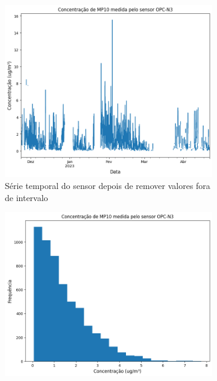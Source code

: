 \begin{figure}[h]
    \centering
    \caption{Série temporal das leituras do sensor OPC-N3}
    \begin{subfigure}{0.495\textwidth}
        \includegraphics[width=\textwidth]{chapters/3-RESULTADOS CAMPO/Figuras/raw-pm10.png}
        \caption{Série temporal do sensor depois de remover valores fora de intervalo}
        \label{fig:data-pm10-raw}
    \end{subfigure}
    \hfill
    \begin{subfigure}{0.495\textwidth}
        \includegraphics[width=\textwidth]{chapters/3-RESULTADOS CAMPO/Figuras/preproc-hist-pm10.png}

\end{subfigure}
\end{figure}

